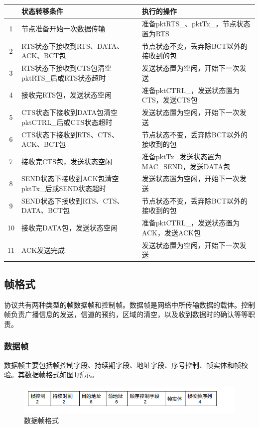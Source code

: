 \begin{table}[!ht]
	\centering
	\begin{tabular}{c p{6cm} p{6cm} }
		\hline  %
		&状态转移条件&执行的操作\\
		\hline  %
		1&节点准备开始一次数据传输 &准备pktRTS\_、pktTx\_，节点状态置为RTS\\
		2&RTS状态下接收到RTS、DATA、ACK、BCT包&节点状态不变，丢弃除BCT以外的接收到的包\\
		3&RTS状态下接收到CTS包清空pktRTS\_后或RTS状态超时&发送状态置为空闲，开始下一次发送\\
		4&接收完RTS包，发送状态空闲&准备pktCTRL\_，发送状态置为CTS，发送CTS包\\
		5&CTS状态下接收到DATA包清空pktCTRL\_后或CTS状态超时&发送状态置为空闲，开始下一次发送\\
		6&CTS状态下接收到RTS、CTS、ACK、BCT包&节点状态不变，丢弃除BCT以外的接收到的包\\
		7&接收完CTS包，发送状态空闲&准备pktTx\_发送状态置为MAC\_SEND，发送DATA包\\
		8&SEND状态下接收到ACK包清空pktTx\_后或SEND状态超时&发送状态置为空闲，开始下一次发送\\
		9&SEND状态下接收到RTS、CTS、DATA、BCT包&节点状态不变，丢弃除BCT以外的接收到的包\\
		10&接收完DATA包，发送状态空闲&准备pktCTRL\_，发送状态置为ACK，发送ACK包\\
		11&ACK发送完成&发送状态置为空闲，开始下一次发送\\
		\hline
	\end{tabular}
\end{table}

\subsection{帧格式}
协议共有两种类型的帧数据帧和控制帧。数据帧是网络中所传输数据的载体。控制帧负责广播信息的发送，信道的预约，区域的清空，以及收到数据时的确认等等职责。
\subsubsection{数据帧}
数据帧主要包括帧控制字段、持续期字段、地址字段、序号控制、帧实体和帧校验。其数据帧格式如图\ref{fig9}所示。
\begin{figure}[!ht]
	\centering
	\includegraphics[scale=0.5]{figures/data.png}
	\caption{
		数据帧格式
	}
	\label{fig9}
\end{figure}

